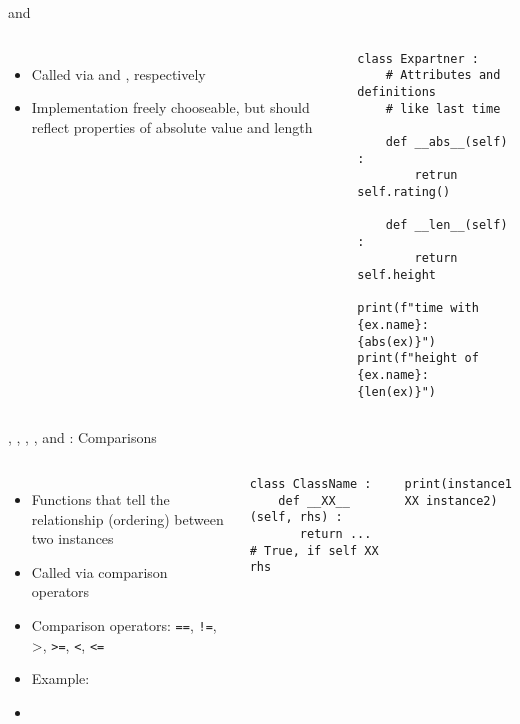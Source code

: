 
\begin{frame}[fragile]{ and }
%
\begin{columns}[T]
\begin{itemize}
\item Called via  and , respectively
\item Implementation freely chooseable, but should reflect properties of absolute value and length
\end{itemize}
%
\begin{codebox}
\begin{verbatim}
class Expartner :
    # Attributes and definitions
    # like last time
    
    def __abs__(self) :
        retrun self.rating()
    
    def __len__(self) :
        return self.height

print(f"time with {ex.name}: {abs(ex)}")
print(f"height of {ex.name}: {len(ex)}")
\end{verbatim}
\end{codebox}
\end{columns}
%
\end{frame}


\begin{frame}[fragile]{, , , ,  and : Comparisons}
%
\begin{columns}[T]
\begin{itemize}
\item Functions that tell the relationship (ordering) between two instances
\item Called via comparison operators
\item Comparison operators: \texttt{==}, \texttt{!=}, >, \texttt{>=}, \texttt{<}, \texttt{<=}
\item Example:  
\item[\Thus] 
\end{itemize}
%
\begin{codebox}
\begin{verbatim}
class ClassName :
    def __XX__ (self, rhs) :
       return ... # True, if self XX rhs
\end{verbatim}
\end{codebox}
%
\begin{codebox}
\begin{verbatim}
print(instance1 XX instance2)
\end{verbatim}
\end{codebox}
\end{columns}
%
\end{frame}

